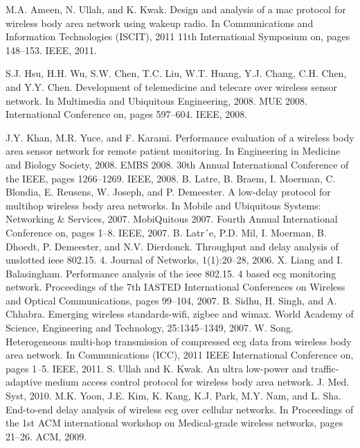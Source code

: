 \documentclass[11pt, conference, compsocconf, onecolumn]{IEEEtran}
\begin{document}
\begin{thebibliography}{0}

 M.A. Ameen, N. Ullah, and K. Kwak. Design and analysis of a mac protocol for wireless body area network using wakeup radio. In
Communications and Information Technologies (ISCIT), 2011 11th International Symposium on, pages 148–153. IEEE, 2011.

 S.J. Hsu, H.H. Wu, S.W. Chen, T.C. Liu, W.T. Huang, Y.J. Chang, C.H. Chen, and Y.Y. Chen. Development of telemedicine and
telecare over wireless sensor network. In Multimedia and Ubiquitous Engineering, 2008. MUE 2008. International Conference on,
pages 597–604. IEEE, 2008.

 J.Y. Khan, M.R. Yuce, and F. Karami. Performance evaluation of a wireless body area sensor network for remote patient monitoring. In
Engineering in Medicine and Biology Society, 2008. EMBS 2008. 30th Annual International Conference of the IEEE, pages 1266–1269.
IEEE, 2008.
 B. Latre, B. Braem, I. Moerman, C. Blondia, E. Reusens, W. Joseph, and P. Demeester. A low-delay protocol for multihop wireless
body area networks. In Mobile and Ubiquitous Systems: Networking \& Services, 2007. MobiQuitous 2007. Fourth Annual International
Conference on, pages 1–8. IEEE, 2007.
 B. Latr´e, P.D. Mil, I. Moerman, B. Dhoedt, P. Demeester, and N.V. Dierdonck. Throughput and delay analysis of unslotted ieee 802.15.
4. Journal of Networks, 1(1):20–28, 2006.
 X. Liang and I. Balasingham. Performance analysis of the ieee 802.15. 4 based ecg monitoring network. Proceedings of the 7th
IASTED International Conferences on Wireless and Optical Communications, pages 99–104, 2007.
 B. Sidhu, H. Singh, and A. Chhabra. Emerging wireless standards-wifi, zigbee and wimax. World Academy of Science, Engineering
and Technology, 25:1345–1349, 2007.
 W. Song. Heterogeneous multi-hop transmission of compressed ecg data from wireless body area network. In Communications (ICC),
2011 IEEE International Conference on, pages 1–5. IEEE, 2011.
 S. Ullah and K. Kwak. An ultra low-power and traffic-adaptive medium access control protocol for wireless body area network. J.
Med. Syst, 2010.
 M.K. Yoon, J.E. Kim, K. Kang, K.J. Park, M.Y. Nam, and L. Sha. End-to-end delay analysis of wireless ecg over cellular networks.
In Proceedings of the 1st ACM international workshop on Medical-grade wireless networks, pages 21–26. ACM, 2009.
\end{thebibliography}
\end{document}
